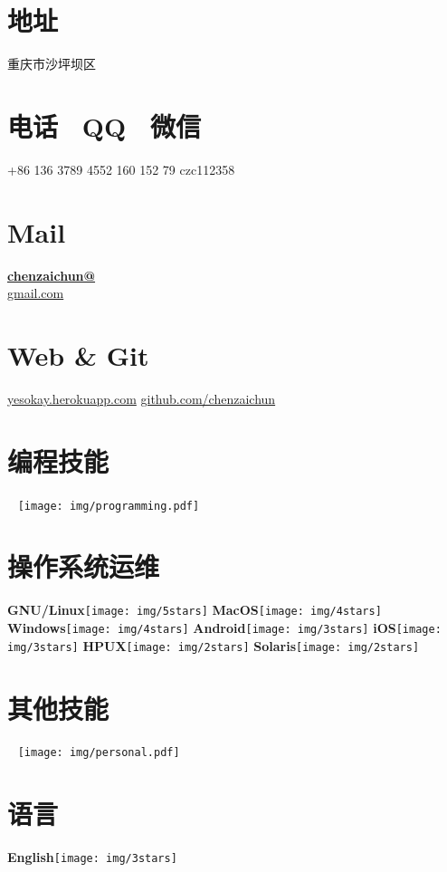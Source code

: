 \documentclass[]{friggeri-cv}
\begin{document}
      {}
      

\begin{aside}
  \section{\cuti 地址}
    重庆市沙坪坝区
  \section{\cuti 电话~ QQ~ 微信}
    +86 136 3789 4552
    160 152 79
    czc112358
  \section{Mail}
    \href{mailto:chenzaichun@gmail.com}{\textbf{chenzaichun@}\\gmail.com}
  \section{Web \& Git}
    \href{http://yesokay.herokuapp.com}{yesokay.herokuapp.com}
    \href{https://github.com/chenzaichun}{github.com/chenzaichun}
  \section{\cuti 编程技能}
    ~
    \texttt{[image: img/programming.pdf]}
    ~
  \section{\cuti 操作系统运维}
    \textbf{GNU/Linux}\texttt{[image: img/5stars]}
    \textbf{MacOS}\texttt{[image: img/4stars]}
    \textbf{Windows}\texttt{[image: img/4stars]}
    \textbf{Android}\texttt{[image: img/3stars]}
    \textbf{iOS}\texttt{[image: img/3stars]}
    \textbf{HPUX}\texttt{[image: img/2stars]}
    \textbf{Solaris}\texttt{[image: img/2stars]}
  \section{\cuti 其他技能}
    ~
    \texttt{[image: img/personal.pdf]}
    ~
  \section{\cuti 语言}
    \textbf{English}\texttt{[image: img/3stars]}
\end{aside}
\end{document}
